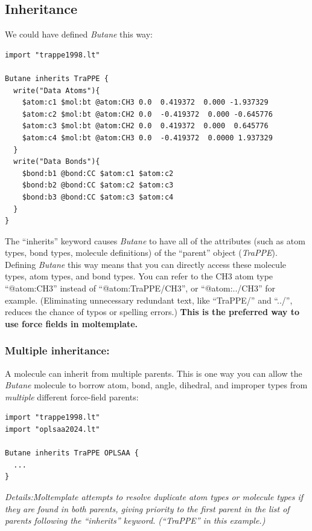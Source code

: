 \documentclass[11pt]{article}
\begin{document}
\subsection{Inheritance}
\label{sec:inheritance}
We could have defined \textit{Butane} this way:
\begin{verbatim}
import "trappe1998.lt"

Butane inherits TraPPE {
  write("Data Atoms"){
    $atom:c1 $mol:bt @atom:CH3 0.0  0.419372  0.000 -1.937329
    $atom:c2 $mol:bt @atom:CH2 0.0  -0.419372  0.000 -0.645776
    $atom:c3 $mol:bt @atom:CH2 0.0  0.419372  0.000  0.645776
    $atom:c4 $mol:bt @atom:CH3 0.0  -0.419372  0.0000 1.937329
  }
  write("Data Bonds"){
    $bond:b1 @bond:CC $atom:c1 $atom:c2
    $bond:b2 @bond:CC $atom:c2 $atom:c3
    $bond:b3 @bond:CC $atom:c3 $atom:c4
  }
}
\end{verbatim}
The ``inherits'' keyword causes \textit{Butane} to have all of the attributes
(such as atom types, bond types, molecule definitions) of the ``parent'' object
(\textit{TraPPE}).
Defining \textit{Butane} this way means that you can directly access
these molecule types, atom types, and bond types.
You can refer to the CH3 atom type ``@atom:CH3'' instead of
``@atom:TraPPE/CH3'', or ``@atom:../CH3'' for example.
(Eliminating unnecessary redundant text, like ``TraPPE/'' and ``../'',
reduces the chance of typos or spelling errors.)
\textbf{This is the preferred way to use force fields in moltemplate.}


\subsubsection{Multiple inheritance:}
\label{sec:multiple_inheritance}
A molecule can inherit from multiple parents.
This is one way you can allow the \textit{Butane} molecule
to borrow atom, bond, angle, dihedral, and improper types from
\textit{multiple} different force-field parents:
\begin{verbatim}
import "trappe1998.lt"
import "oplsaa2024.lt"

Butane inherits TraPPE OPLSAA {
  ...
}
\end{verbatim}
\textit{Details:Moltemplate attempts to resolve duplicate atom types or 
molecule types if they are found in both parents, giving priority to the 
first parent in the list of parents following the ``inherits'' keyword. 
(``TraPPE'' in this example.)
}
\end{document}
